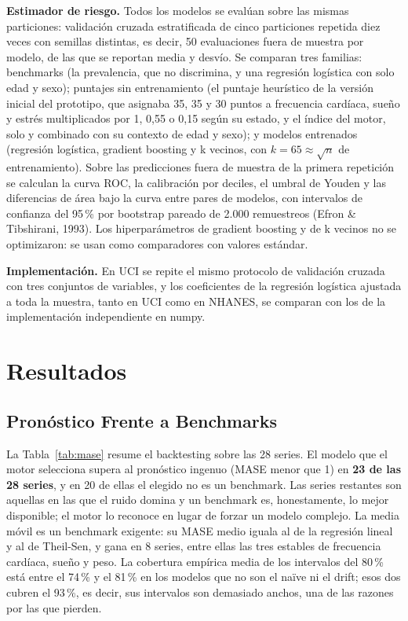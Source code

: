 \documentclass[12pt,letterpaper]{article}
\begin{document}
\textbf{Estimador de riesgo.} Todos los modelos se evalúan sobre las mismas
particiones: validación cruzada estratificada de cinco particiones repetida diez
veces con semillas distintas, es decir, 50 evaluaciones fuera de muestra por
modelo, de las que se reportan media y desvío. Se comparan tres familias:
benchmarks (la prevalencia, que no discrimina, y una regresión logística con solo
edad y sexo); puntajes sin entrenamiento (el puntaje heurístico de la versión
inicial del prototipo, que asignaba 35, 35 y 30 puntos a frecuencia cardíaca,
sueño y estrés multiplicados por 1, 0,55 o 0,15 según su estado, y el índice del
motor, solo y combinado con su contexto de edad y sexo); y modelos entrenados
(regresión logística, gradient boosting y k vecinos, con $k=65\approx\sqrt{n}$ de
entrenamiento). Sobre las predicciones fuera de muestra de la primera repetición
se calculan la curva ROC, la calibración por deciles, el umbral de Youden y las
diferencias de área bajo la curva entre pares de modelos, con intervalos de
confianza del 95\,\% por bootstrap pareado de 2.000 remuestreos (Efron \&
Tibshirani, 1993). Los hiperparámetros de gradient boosting y de k vecinos no se
optimizaron: se usan como comparadores con valores estándar.

\textbf{Implementación.} En UCI se repite el mismo protocolo de validación
cruzada con tres conjuntos de variables, y los coeficientes de la regresión
logística ajustada a toda la muestra, tanto en UCI como en NHANES, se comparan
con los de la implementación independiente en numpy.

\newpage

\section{Resultados}
\label{sec:resultados}

\subsection{Pronóstico Frente a Benchmarks}

La Tabla~\ref{tab:mase} resume el backtesting sobre las 28 series. El modelo que
el motor selecciona supera al pronóstico ingenuo (MASE menor que 1) en
\textbf{23 de las 28 series}, y en 20 de ellas el elegido no es un benchmark. Las
series restantes son aquellas en las que el ruido domina y un benchmark es,
honestamente, lo mejor disponible; el motor lo reconoce en lugar de forzar un
modelo complejo. La media móvil es un benchmark exigente: su MASE medio iguala al
de la regresión lineal y al de Theil-Sen, y gana en 8 series, entre ellas las
tres estables de frecuencia cardíaca, sueño y peso. La cobertura empírica media de
los intervalos del 80\,\% está entre el 74\,\% y el 81\,\% en los modelos que no
son el naïve ni el drift; esos dos cubren el 93\,\%, es decir, sus intervalos son
demasiado anchos, una de las razones por las que pierden.
\end{document}
